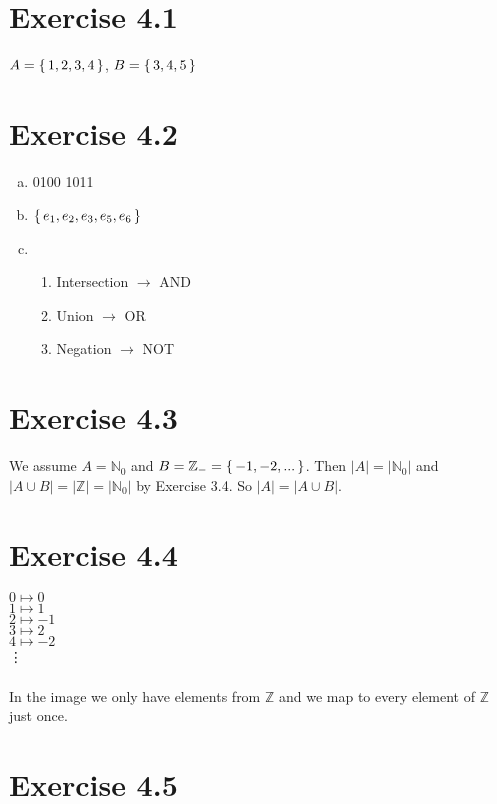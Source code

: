 \documentclass{article} %
\newcommand{\homeworkNumber}{4}
\begin{document}
\section*{Exercise \homeworkNumber.1}

$A = \set{1,2,3,4}$, $B = \set{3,4,5}$

\section*{Exercise \homeworkNumber.2}

\begin{enumerate}[a)]
	\item 0100 1011
	\item $\set{e_1, e_2, e_3, e_5, e_6}$
	\item 
	\begin{enumerate}[]
		\item Intersection $\rightarrow$ AND
		\item Union $\rightarrow$ OR
		\item Negation $\rightarrow$ NOT
	\end{enumerate}
\end{enumerate}


\section*{Exercise \homeworkNumber.3}

We assume $A = \mathbb{N}_0$ and $B = \mathbb{Z}_- = \set{-1, -2, ...}$. Then $|A| = |\mathbb{N}_0|$ and $|A \cup B| = |\mathbb{Z}| = |\mathbb{N}_0|$ by Exercise 3.4. So $|A| = |A \cup B|$.

\section*{Exercise \homeworkNumber.4}

$0 \mapsto 0$\\
$1 \mapsto 1$\\
$2 \mapsto -1$\\
$3 \mapsto 2$\\
$4 \mapsto -2$\\
\vdots\\\\
In the image we only have elements from $\mathbb{Z}$ and we map to every element of $\mathbb{Z}$ just once.

\section*{Exercise \homeworkNumber.5}
\end{document}
